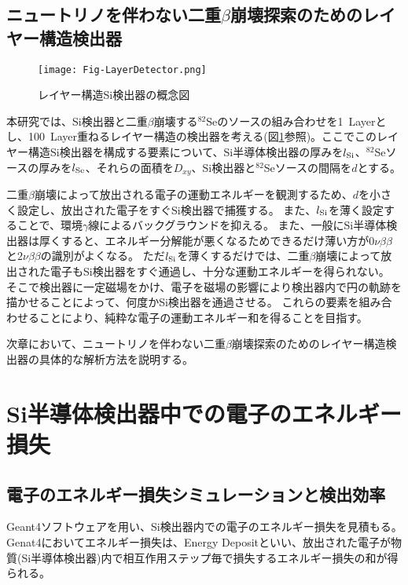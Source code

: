 \documentclass[a4paper,10pt]{jreport}
\begin{document}
\section{ニュートリノを伴わない二重$\beta$崩壊探索のためのレイヤー構造検出器}

\begin{figure}[H]
	\center
	\texttt{[image: Fig-LayerDetector.png]}
	\caption{レイヤー構造Si検出器の概念図} \label{Fig-LayerDetector}
\end{figure}

本研究では、Si検出器と二重$\beta$崩壊する$^{82}$Seのソースの組み合わせを\SI{1}{Layer}とし、\SI{100}{Layer}重ねるレイヤー構造の検出器を考える(図\ref{Fig-LayerDetector}参照)。ここでこのレイヤー構造Si検出器を構成する要素について、Si半導体検出器の厚みを$l_{\rm{Si}}$、$^{82}$Seソースの厚みを$l_{\rm{Se}}$、それらの面積を$D_{xy}$、Si検出器と$^{82}$Seソースの間隔を$d$とする。

二重$\beta$崩壊によって放出される電子の運動エネルギーを観測するため、$d$を小さく設定し、放出された電子をすぐSi検出器で捕獲する。
また、$l_{\rm{Si}}$を薄く設定することで、環境$\gamma$線によるバックグラウンドを抑える。
また、一般にSi半導体検出器は厚くすると、エネルギー分解能が悪くなるためできるだけ薄い方が$0\nu\beta\beta$と$2\nu\beta\beta$の識別がよくなる。
ただ$l_{\rm{Si}}$を薄くするだけでは、二重$\beta$崩壊によって放出された電子もSi検出器をすぐ通過し、十分な運動エネルギーを得られない。
そこで検出器に一定磁場をかけ、電子を磁場の影響により検出器内で円の軌跡を描かせることによって、何度かSi検出器を通過させる。
これらの要素を組み合わせることにより、純粋な電子の運動エネルギー和を得ることを目指す。

次章において、ニュートリノを伴わない二重$\beta$崩壊探索のためのレイヤー構造検出器の具体的な解析方法を説明する。



\chapter{Si半導体検出器中での電子のエネルギー損失}



\section{電子のエネルギー損失シミュレーションと検出効率}

Geant4ソフトウェアを用い、Si検出器内での電子のエネルギー損失を見積もる。
Genat4においてエネルギー損失は、Energy Depositといい、放出された電子が物質(Si半導体検出器)内で相互作用ステップ毎で損失するエネルギー損失の和が得られる。
\end{document}
